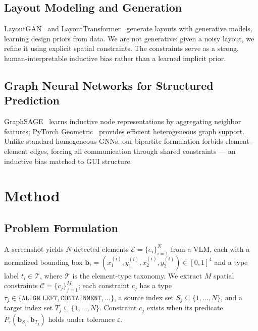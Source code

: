 \documentclass[conference]{IEEEtran}
\begin{document}
\subsection{Layout Modeling and Generation}
LayoutGAN~\cite{li2019layoutgan} and
LayoutTransformer~\cite{gupta2021layouttransformer} generate layouts with
generative models, learning design priors from data. We are not generative:
given a noisy layout, we refine it using explicit spatial constraints. The
constraints serve as a strong, human-interpretable inductive bias rather than
a learned implicit prior.

\subsection{Graph Neural Networks for Structured Prediction}
GraphSAGE~\cite{hamilton2017sage} learns inductive node representations by
aggregating neighbor features; PyTorch Geometric~\cite{fey2019pyg} provides
efficient heterogeneous graph support. Unlike standard homogeneous GNNs, our
bipartite formulation forbids element--element edges, forcing all
communication through shared constraints --- an inductive bias matched to GUI
structure.

\section{Method}
\subsection{Problem Formulation}
A screenshot yields $N$ detected elements
$\mathcal{E}=\{e_i\}_{i=1}^{N}$ from a VLM, each with a normalized bounding
box $\mathbf{b}_i=(x_1^{(i)},y_1^{(i)},x_2^{(i)},y_2^{(i)})\in[0,1]^4$ and a
type label $t_i\in\mathcal{T}$, where $\mathcal{T}$ is the element-type
taxonomy. We extract $M$ spatial constraints
$\mathcal{C}=\{c_j\}_{j=1}^{M}$; each constraint $c_j$ has a type
$\tau_j\in\{\texttt{ALIGN\_LEFT},\texttt{CONTAINMENT},\dots\}$, a source index
set $S_j\subseteq\{1,\dots,N\}$, and a target index set
$T_j\subseteq\{1,\dots,N\}$. Constraint $c_j$ exists when its predicate
$P_{\tau}(\mathbf{b}_{S_j},\mathbf{b}_{T_j})$ holds under tolerance
$\varepsilon$.
\end{document}

